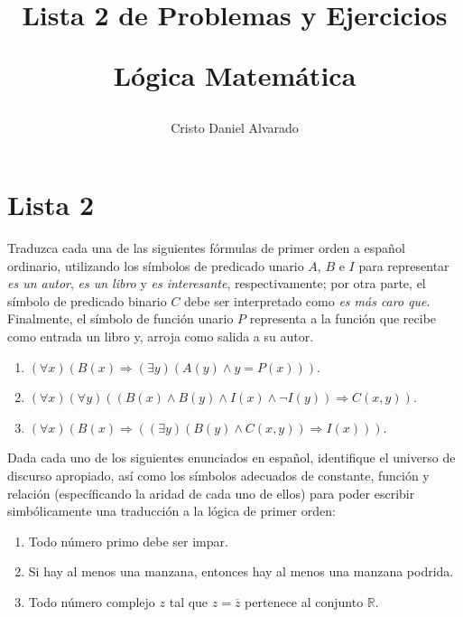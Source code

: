 \documentclass[12pt]{report}
\newcounter{it}
\theoremstyle{largebreak}
\begin{document}
    \setlength{\parskip}{5pt} %
    \setlength{\parindent}{12pt} %
    \title{Lista 2 de Problemas y Ejercicios
    
    Lógica Matemática}
    \author{Cristo Daniel Alvarado}
    \maketitle

    
    \setcounter{chapter}{1}

    \chapter{Lista 2}
    
    \setcounter{section}{1}

    \begin{excer}
        Traduzca cada una de las siguientes fórmulas de primer orden a español ordinario, utilizando los símbolos de predicado unario $A$, $B$ e $I$ para representar \textit{es un autor}, \textit{es un libro} y \textit{es interesante}, respectivamente; por otra parte, el símbolo de predicado binario $C$ debe ser interpretado como \textit{es más caro que}. Finalmente, el símbolo de función unario $P$ representa a la función que recibe como entrada un libro y, arroja como salida a su autor.
        \begin{enumerate}[label=($\alph*$)]
            \item $(\forall x)(B(x)\Rightarrow (\exists y)(A(y)\land y=P(x)))$.
            \item $(\forall x)(\forall y)((B(x)\land B(y)\land I(x)\land\neg I(y))\Rightarrow C(x,y))$.
            \item $(\forall x)(B(x)\Rightarrow((\exists y)(B(y)\land C(x,y))\Rightarrow I(x)))$.
        \end{enumerate}
    \end{excer}

    \begin{sol}
    \end{sol}

    \begin{excer}
        Dada cada uno de los siguientes enunciados en español, identifique el universo de discurso apropiado, así como los símbolos adecuados de constante, función y relación (específicando la aridad de cada uno de ellos) para poder escribir simbólicamente una traducción a la lógica de primer orden:
        \begin{enumerate}[label=($\alph*$)]
            \item Todo número primo debe ser impar.
            \item Si hay al menos una manzana, entonces hay al menos una manzana podrida.
            \item Todo número complejo $z$ tal que $z=\overline{z}$ pertenece al conjunto $\mathbb{R}$.
        \end{enumerate}
    \end{excer}
\end{document}

